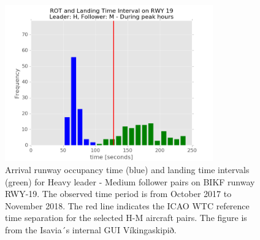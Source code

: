 \begin{figure}[h]
    \centering
    \includegraphics[width=0.8\textwidth]{graphics/fig_rot_landig_time_interval_RWY19_leader_H_follower_M_peak-hour_BAR_20171004_20181130.png}
    \caption[AROT and LTI of H-M pairs on RWY~19]{Arrival runway occupancy time (blue) and landing time intervals (green) for Heavy leader - Medium follower pairs on BIKF runway RWY-19. The observed time period is from October 2017 to November 2018. The red line indicates the ICAO WTC reference time separation for the selected H-M aircraft pairs. The figure is from the Isavia´s internal GUI Víkingaskipið.}\label{fig:AROT_LTI_rwy19_H_M}
\end{figure}




